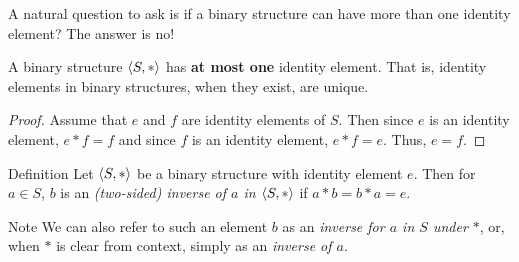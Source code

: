  A natural question to ask is if a binary structure can have
more than one identity element?  The answer is no!
\begin{thm}\label{uniqueid} A binary structure $\langle S, *\rangle$ has \textbf{at most one} identity element.  That is, identity elements in binary structures, when they exist, are unique.
\end{thm}

\begin{proof} Assume that $e$ and $f$ are identity elements of $S$.  Then since $e$ is an identity element, $e*f=f$ and since $f$ is an identity element, $e*f=e$.  Thus, $e=f$.\end{proof}

\begin{df}{Definition} Let $\langle S, *\rangle$ be a binary structure with identity
element $e$.  Then for $a\in S$, $b$ is an \textit{(two-sided)
inverse of $a$ in $\langle S,*\rangle$} if $a*b=b*a=e$. \end{df}

\begin{df}{Note} We can also refer to such an element $b$ as  an \textit{inverse for $a$ in $S$ under $*$}, or, when $*$ is clear from context, simply as an \textit{inverse of $a$}.\end{df}

